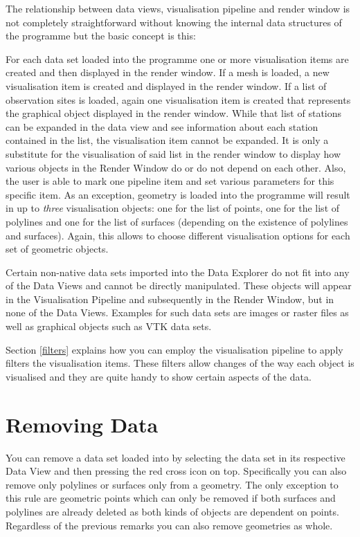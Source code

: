 The relationship between data views, visualisation pipeline and render window is not completely straightforward without knowing the internal data structures of the programme but the basic concept is this:

For each data set loaded into the programme one or more visualisation items are created and then displayed in the render window. If a mesh is loaded, a new visualisation item is created and displayed in the render window. If a list of observation sites is loaded, again one visualisation item is created that represents the graphical object displayed in the render window. While that list of stations can be expanded in the data view and see information about each station contained in the list, the visualisation item cannot be expanded. It is only a substitute for the visualisation of said list in the render window to display how various objects in the Render Window do or do not depend on each other. Also, the user is able to mark one pipeline item and set various parameters for this specific item. As an exception, geometry is loaded into the programme will result in up to \emph{three} visualisation objects: one for the list of points, one for the list of polylines and one for the list of surfaces (depending on the existence of polylines and surfaces). Again, this allows to choose different visualisation options for each set of geometric objects.

Certain non-native data sets imported into the Data Explorer do not fit into any of the Data Views and cannot be directly manipulated. These objects will appear in the Visualisation Pipeline and subsequently in the Render Window, but in none of the Data Views. Examples for such data sets are images or raster files as well as graphical objects such as VTK data sets.

Section \ref{filters} explains how you can employ the visualisation pipeline to apply filters the visualisation items. These filters allow changes of the way each object is visualised and they are quite handy to show certain aspects of the data.

\section{Removing Data}

You can remove a data set loaded into \ogs by selecting the data set in its respective Data View and then pressing the red cross icon on top. Specifically you can also remove only polylines or surfaces only from a geometry. The only exception to this rule are geometric points which can only be removed if both surfaces and polylines are already deleted as both kinds of objects are dependent on points. Regardless of the previous remarks you can also remove geometries as whole. 
